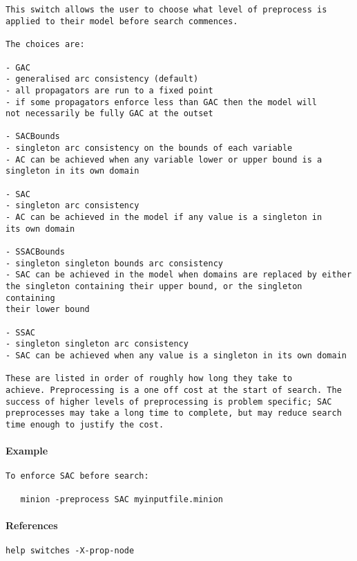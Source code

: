 \paragraph{}
{\footnotesize
\begin{verbatim}

This switch allows the user to choose what level of preprocess is
applied to their model before search commences.

The choices are:

- GAC
- generalised arc consistency (default)
- all propagators are run to a fixed point
- if some propagators enforce less than GAC then the model will
not necessarily be fully GAC at the outset

- SACBounds
- singleton arc consistency on the bounds of each variable
- AC can be achieved when any variable lower or upper bound is a
singleton in its own domain

- SAC
- singleton arc consistency
- AC can be achieved in the model if any value is a singleton in
its own domain

- SSACBounds
- singleton singleton bounds arc consistency
- SAC can be achieved in the model when domains are replaced by either
the singleton containing their upper bound, or the singleton containing
their lower bound

- SSAC
- singleton singleton arc consistency
- SAC can be achieved when any value is a singleton in its own domain

These are listed in order of roughly how long they take to
achieve. Preprocessing is a one off cost at the start of search. The
success of higher levels of preprocessing is problem specific; SAC
preprocesses may take a long time to complete, but may reduce search
time enough to justify the cost.
\end{verbatim}
}
\paragraph{Example}
{\footnotesize
\begin{verbatim}
To enforce SAC before search:

   minion -preprocess SAC myinputfile.minion
\end{verbatim}
}
\paragraph{References}
{\footnotesize
\begin{verbatim}
help switches -X-prop-node
\end{verbatim}
}
